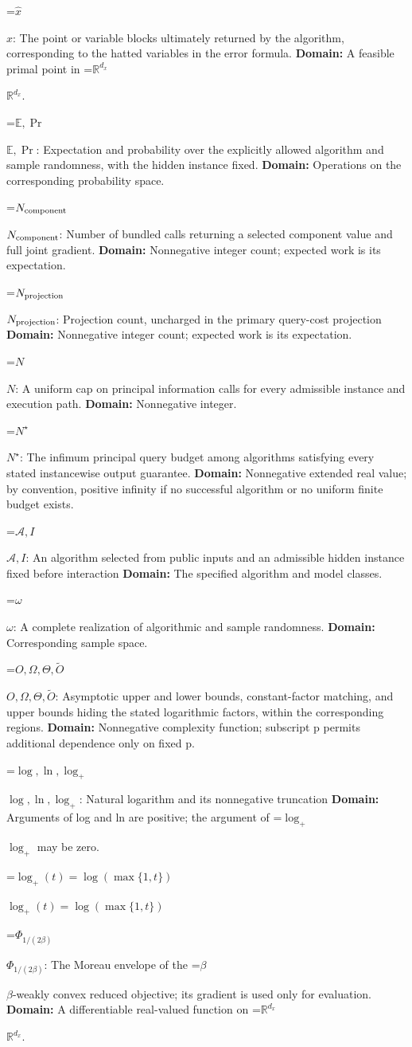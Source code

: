 \documentclass[10pt,a4paper]{article}
\newcommand{\AtlasMath}[1]{\par\begingroup\centering\setbox0=\hbox{$\displaystyle #1$}\ifdim\wd0>1.4\linewidth\typeout{ATLAS WIDE FORMULA: \the\wd0}\fi\ifdim\wd0>\linewidth\resizebox{\linewidth}{!}{\box0}\else\box0\fi\par\endgroup}
\newcommand{\AtlasInlineMath}[1]{\begingroup\setbox0=\hbox{$#1$}\ifdim\wd0>.4\linewidth\endgroup\AtlasMath{#1}\else\endgroup$#1$\fi}
\begin{document}
\AtlasInlineMath{\widehat x}: The point or variable blocks ultimately returned by the algorithm, corresponding to the hatted variables in the error formula. \textbf{Domain:} A feasible primal point in \AtlasInlineMath{\mathbb R^{d_x}}.

\AtlasInlineMath{\mathbb E,\Pr}: Expectation and probability over the explicitly allowed algorithm and sample randomness, with the hidden instance fixed. \textbf{Domain:} Operations on the corresponding probability space.

\AtlasInlineMath{N_{\rm component}}: Number of bundled calls returning a selected component value and full joint gradient. \textbf{Domain:} Nonnegative integer count; expected work is its expectation.

\AtlasInlineMath{N_{\rm projection}}: Projection count, uncharged in the primary query-cost projection \textbf{Domain:} Nonnegative integer count; expected work is its expectation.

\AtlasInlineMath{N}: A uniform cap on principal information calls for every admissible instance and execution path. \textbf{Domain:} Nonnegative integer.

\AtlasInlineMath{N^\star}: The infimum principal query budget among algorithms satisfying every stated instancewise output guarantee. \textbf{Domain:} Nonnegative extended real value; by convention, positive infinity if no successful algorithm or no uniform finite budget exists.

\AtlasInlineMath{\mathcal A,I}: An algorithm selected from public inputs and an admissible hidden instance fixed before interaction \textbf{Domain:} The specified algorithm and model classes.

\AtlasInlineMath{\omega}: A complete realization of algorithmic and sample randomness. \textbf{Domain:} Corresponding sample space.

\AtlasInlineMath{O,\Omega,\Theta,\widetilde O}: Asymptotic upper and lower bounds, constant-factor matching, and upper bounds hiding the stated logarithmic factors, within the corresponding regions. \textbf{Domain:} Nonnegative complexity function; subscript p permits additional dependence only on fixed p.

\AtlasInlineMath{\log,\ln,\log_+}: Natural logarithm and its nonnegative truncation \textbf{Domain:} Arguments of log and ln are positive; the argument of \AtlasInlineMath{\log_+} may be zero.

\AtlasInlineMath{\log_+(t)=\log(\max\{1,t\})}

\AtlasInlineMath{\Phi_{1/(2\beta)}}: The Moreau envelope of the \AtlasInlineMath{\beta}-weakly convex reduced objective; its gradient is used only for evaluation. \textbf{Domain:} A differentiable real-valued function on \AtlasInlineMath{\mathbb R^{d_x}}.
\end{document}
